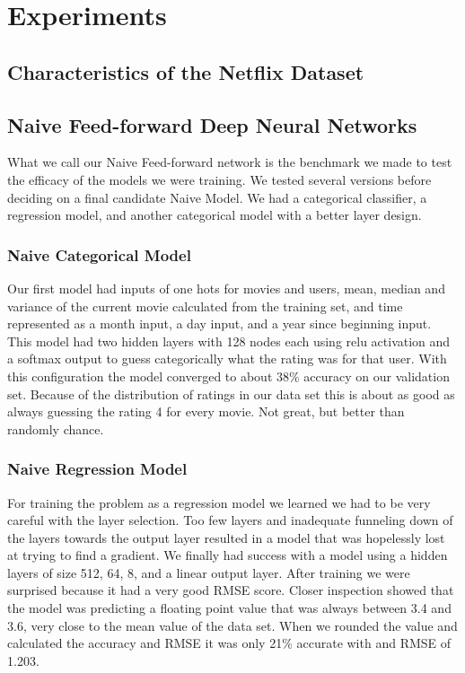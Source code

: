 \section{Experiments}
\subsection{Characteristics of the Netflix Dataset}
\subsection{Naive Feed-forward Deep Neural Networks}
What we call our Naive Feed-forward network is the benchmark we made to test the efficacy of the models we were training. We tested several versions before deciding on a final candidate Naive Model. We had a categorical classifier, a regression model, and another categorical model with a better layer design.
\subsubsection{Naive Categorical Model} 
Our first model had inputs of one hots for movies and users, mean, median and variance of the current movie calculated from the training set, and time represented as a month input, a day input, and a year since beginning input. This model had two hidden layers with 128 nodes each using relu activation and a softmax output to guess categorically what the rating was for that user. With this configuration the model converged to about 38\% accuracy on our validation set. Because of the distribution of ratings in our data set this is about as good as always guessing the rating 4 for every movie. Not great, but better than randomly chance.
\subsubsection{Naive Regression Model}
For training the problem as a regression model we learned we had to be very careful with the layer selection. Too few layers and inadequate funneling down of the layers towards the output layer resulted in a model that was hopelessly lost at trying to find a gradient. We finally had success with a model using a hidden layers of size 512, 64, 8, and a linear output layer. After training we were surprised  because it had a very good RMSE score. Closer inspection showed that the model was predicting a floating point value that was always between 3.4 and 3.6, very close to the mean value of the data set. When we rounded the value and calculated the accuracy and RMSE it was only 21\% accurate with and RMSE of 1.203.
